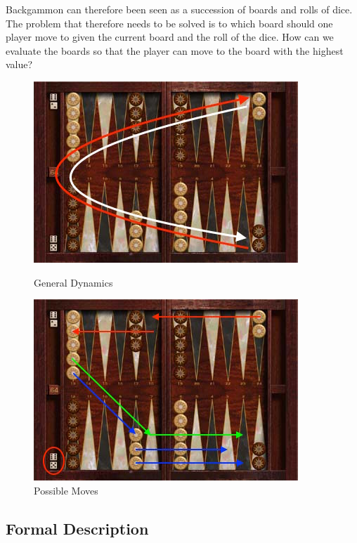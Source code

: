 \documentclass[11pt]{article}
\begin{document}
\noindent Backgammon can therefore been seen as a succession of boards and rolls of dice. The problem that therefore needs to be solved is to which board should one player move to given the current board and the roll of the dice. How can we evaluate the boards so that the player can move to the board with the highest value?

\begin{figure}[H]
\centering
\begin{minipage}{.35\textwidth}
  \centering
  \includegraphics[width=0.75\linewidth]{board_general.jpg}
  \caption{General Dynamics}
\end{minipage}%
\begin{minipage}{.35\textwidth}
  \centering
  \includegraphics[width=0.75\linewidth]{moves.jpg}
  \caption{Possible Moves}
\end{minipage}
\end{figure}

\subsection{Formal Description}
\end{document}
